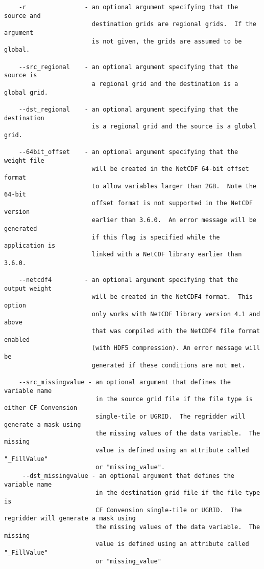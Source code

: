 \begin{verbatim}
    -r                - an optional argument specifying that the source and
                        destination grids are regional grids.  If the argument
                        is not given, the grids are assumed to be global.

    --src_regional    - an optional argument specifying that the source is
                        a regional grid and the destination is a global grid.

    --dst_regional    - an optional argument specifying that the destination
                        is a regional grid and the source is a global grid.

    --64bit_offset    - an optional argument specifying that the weight file
                        will be created in the NetCDF 64-bit offset format
                        to allow variables larger than 2GB.  Note the 64-bit
                        offset format is not supported in the NetCDF version
                        earlier than 3.6.0.  An error message will be generated
                        if this flag is specified while the application is
                        linked with a NetCDF library earlier than 3.6.0.

    --netcdf4         - an optional argument specifying that the output weight
                        will be created in the NetCDF4 format.  This option 
                        only works with NetCDF library version 4.1 and above 
                        that was compiled with the NetCDF4 file format enabled 
                        (with HDF5 compression). An error message will be 
                        generated if these conditions are not met.

    --src_missingvalue - an optional argument that defines the variable name 
                         in the source grid file if the file type is either CF Convension
                         single-tile or UGRID.  The regridder will generate a mask using 
                         the missing values of the data variable.  The missing 
                         value is defined using an attribute called "_FillValue" 
                         or "missing_value". 
     --dst_missingvalue - an optional argument that defines the variable name
                         in the destination grid file if the file type is
                         CF Convension single-tile or UGRID.  The regridder will generate a mask using
                         the missing values of the data variable.  The missing
                         value is defined using an attribute called "_FillValue"
                         or "missing_value"


\end{verbatim}
